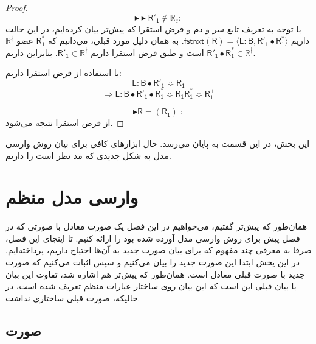 \begin{proof}
	$$\blacktriangleright\blacktriangleright\mathsf{R'_1} \notin \mathbb{R_\varepsilon}:$$
با توجه به تعریف تابع سر و دم و فرض استقرا که پیش‌تر بیان کرده‌ایم، در این حالت داریم 
	$\mathsf{fstnxt(R)=\langle L:B , R'_1 \bullet R_1^* \rangle}$.
	به همان دلیل مورد قبلی، می‌دانیم که $\mathsf{R_1^*}$ عضو $\mathbb{R^\nmid}$ است و طبق فرض استقرا داریم $\mathsf{R'_1} \in \mathbb{R^\nmid}$. بنابراین داریم
		$\mathsf{R'_1 \bullet R_1^*} \in \mathbb{R^\nmid}$.
		
		با استفاده از فرض استقرا داریم:
		$$\mathsf{L:B \bullet R'_1 \Bumpeq R_1}$$
		$$\Rightarrow \mathsf{L:B \bullet R'_1 \bullet R_1^* \Bumpeq R_1 R_1^* \Bumpeq R_1^+}$$
	
	$$\blacktriangleright\mathsf{R=(R_1)\;:}$$
	از فرض استقرا نتیجه می‌شود.
\end{proof}

این بخش، در این قسمت به پایان می‌رسد. حال ابزارهای کافی برای بیان روش وارسی مدل به شکل جدیدی که مد نظر است را داریم.

\section{وارسی مدل منظم}
همان‌طور که پیش‌تر گفتیم، می‌خواهیم در این فصل یک صورت معادل با صورتی که در فصل پیش برای روش وارسی مدل آورده شده بود را ارائه کنیم. تا اینجای این فصل، صرفا به معرفی چند مفهوم که برای بیان  صورت جدید به آن‌ها احتیاج داریم، پرداخته‌ایم. در این یخش ابتدا این صورت جدید را بیان می‌‌کنیم و سپس اثبات می‌‌کنیم که صورت جدید با صورت قبلی معادل است. همان‌طور که پیش‌تر هم اشاره شد، تفاوت این بیان با بیان قبلی این است که این بیان روی ساختار عبارات منظم تعریف شده است، در حالیکه، صورت قبلی ساختاری نداشت.
\subsection{صورت}

